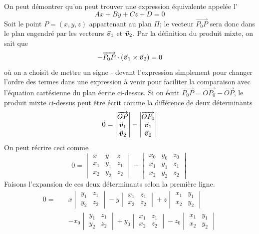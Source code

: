 On peut démontrer qu'on peut trouver une expression équivalente appelée l'
\[
Ax + By + Cz + D = 0
\]
Soit le point $P = (x, y, z)$ appartenant au plan $\Pi$; le vecteur $\overrightarrow{P_0P}$ sera donc 
dans le plan engendré par les vecteurs $\vec{\boldsymbol{v}}_1$  et $\vec{\boldsymbol{v}}_2$. Par la définition du produit
mixte, on sait que
\[
-\overrightarrow{P_0P} \cdot (\vec{\boldsymbol{v}}_1 \times \vec{\boldsymbol{v}}_2) = 0
\]
où on a choisit de mettre un signe - devant l'expression simplement pour
changer l'ordre des termes dans une expression à venir pour faciliter la comparaison
avec l'équation cartésienne du plan écrite ci-dessus.
Si on écrit $\overrightarrow{P_0P} = \overrightarrow{OP_0} - \overrightarrow{OP}$, le produit mixte ci-dessus
peut être écrit comme la différence de deux déterminants
\[
0 = \begin{vmatrix}
\overrightarrow{OP}\\
\vec{\boldsymbol{v}}_1 \\
\vec{\boldsymbol{v}}_2
\end{vmatrix} 
-
\begin{vmatrix}
\overrightarrow{OP_0}\\
\vec{\boldsymbol{v}}_1 \\
\vec{\boldsymbol{v}}_2
\end{vmatrix} 
\]
On peut récrire ceci comme
\[
0 = \begin{vmatrix}
x & y & z \\
x_1 & y_1 & z_1 \\
x_2 & y_2 & z_2
\end{vmatrix}
-
\begin{vmatrix}
x_0 & y_0 & z_0 \\
x_1 & y_1 & z_1 \\
x_2 & y_2 & z_2
\end{vmatrix}
\]
Faisons l'expansion de ces deux déterminants selon la première ligne.
\begin{align*}
0 =\quad & x \begin{vmatrix}
y_1 & z_1\\
y_2 & z_2
\end{vmatrix}
-
y \begin{vmatrix}
x_1 & z_1 \\
x_2 & z_2
\end{vmatrix}
+
z \begin{vmatrix}
x_1 & y_1 \\
x_2 & y_2
\end{vmatrix} \\
& -x_0 \begin{vmatrix}
y_1 & z_1\\
y_2 & z_2
\end{vmatrix}
+
y_0 \begin{vmatrix}
x_1 & z_1 \\
x_2 & z_2
\end{vmatrix}
-
z_0 \begin{vmatrix}
x_1 & y_1 \\
x_2 & y_2
\end{vmatrix}
\end{align*}
